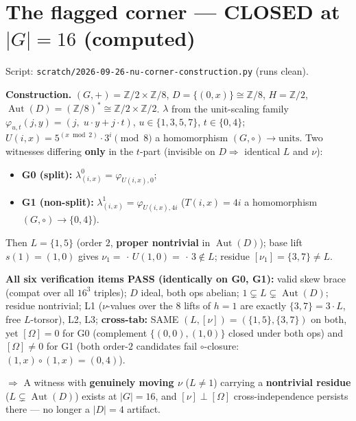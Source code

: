 \documentclass[11pt]{article}
\newcommand{\Aut}{\operatorname{Aut}}
\newcommand{\Z}{\mathbb{Z}}
\newcommand{\nubr}{[\nu]}
\newcommand{\Om}{[\Omega]}
\begin{document}
\section{The flagged corner --- CLOSED at $|G|=16$ (computed)}
Script: \texttt{scratch/2026-09-26-nu-corner-construction.py} (runs clean).

\medskip\noindent\textbf{Construction.}
$(G,+)=\Z/2\times\Z/8$, $D=\{(0,x)\}\cong\Z/8$, $H=\Z/2$, $\Aut(D)=(\Z/8)^{*}\cong\Z/2\times\Z/2$.
$\lambda$ from the unit-scaling family $\varphi_{u,t}(j,y)=(j,\;u\cdot y + j\cdot t)$,
$u\in\{1,3,5,7\}$, $t\in\{0,4\}$; $U(i,x)=5^{(x\bmod 2)}\cdot 3^{i}\pmod 8$ a homomorphism
$(G,\circ)\to\text{units}$. Two witnesses differing \textbf{only} in the $t$-part (invisible on
$D\Rightarrow$ identical $L$ and $\nu$):
\begin{itemize}
  \item \textbf{G0 (split):} $\lambda^0_{(i,x)}=\varphi_{U(i,x),0}$;
  \item \textbf{G1 (non-split):} $\lambda^1_{(i,x)}=\varphi_{U(i,x),4i}$
        ($T(i,x)=4i$ a homomorphism $(G,\circ)\to\{0,4\}$).
\end{itemize}
Then $L=\{1,5\}$ (order $2$, \textbf{proper nontrivial} in $\Aut(D)$); base lift $s(1)=(1,0)$
gives $\nu_1=\,\cdot\,U(1,0)=\,\cdot\,3\notin L$; residue $[\nu_1]=\{3,7\}\neq L$.

\medskip\noindent\textbf{All six verification items PASS (identically on G0, G1):}
valid skew brace (compat over all $16^3$ triples); $D$ ideal, both ops abelian;
$1\subsetneq L\subsetneq\Aut(D)$; residue nontrivial; L1 ($\nu$-values over the $8$ lifts of
$h=1$ are exactly $\{3,7\}=3\cdot L$, free $L$-torsor), L2, L3;
\textbf{cross-tab:} SAME $(L,\nubr)=(\{1,5\},\{3,7\})$ on both, yet $\Om=0$ for G0
(complement $\{(0,0),(1,0)\}$ closed under both ops) and $\Om\neq 0$ for G1
(both order-$2$ candidates fail $\circ$-closure: $(1,x)\circ(1,x)=(0,4)$).

\medskip\noindent$\Rightarrow$ A witness with \textbf{genuinely moving $\nu$} ($L\neq 1$)
carrying a \textbf{nontrivial residue} ($L\subsetneq\Aut(D)$) exists at $|G|=16$, and
$\nubr\perp\Om$ cross-independence persists there --- no longer a $|D|=4$ artifact.
\end{document}
